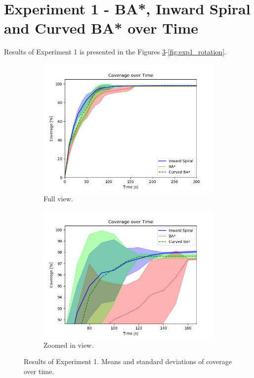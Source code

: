 \section{Experiment 1 - BA*, Inward Spiral and Curved BA* over Time}
Results of Experiment 1 is presented in the Figures \ref{fig:exp1_coverage}-\ref{fig:exp1_rotation}. 

\begin{figure}
\centering
    \begin{subfigure}{0.85\textwidth}
    \centering
    \includegraphics[width=\textwidth]{figures/exp1_coverage.png}
    \caption{Full view.}
    \label{fig:exp1_coverage_full}
    \end{subfigure}
    \begin{subfigure}{0.85\textwidth}
    \centering
    \includegraphics[width=\textwidth]{figures/exp1_coverage_zoom.png}
    \caption{Zoomed in view.}
    \label{fig:exp1_coverage_zoom}
    \end{subfigure}
    \caption{Results of Experiment 1. Means and standard deviations of coverage over time.}
    \label{fig:exp1_coverage}
\end{figure}


